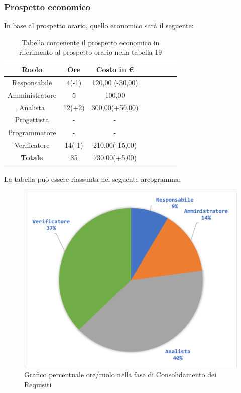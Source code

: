 		\subsubsection{Prospetto economico}
			In base al prospetto orario, quello economico sarà il seguente: 
			
			\begin{longtable}{|c|c|c|c|c|c|c|c}
				\hline
				\rowcolor{lighter-grayer}
				\textbf{Ruolo} & \textbf{Ore} & \textbf{Costo in €} \\
				\hline
				\endfirsthead
				
				\hline
				Responsabile & 4(-1) & 120,00 (-30,00)\\
				\hline
				\hline
				Amministratore & 5 & 100,00\\
				\hline
				\hline
				Analista & 12(+2) & 300,00(+50,00)\\
				\hline
				\hline
				Progettista & - & -\\
				\hline
				\hline
				Programmatore & -  & -\\
				\hline
				\hline
				Verificatore & 14(-1) & 210,00(-15,00)\\
				\hline
				\textbf{Totale} & 35 & 730,00(+5,00)\\
				\hline
				\caption{Tabella contenente il prospetto economico in riferimento al prospetto orario nella tabella 19}
			\end{longtable}
			\pagebreak
			
			La tabella può essere riassunta nel seguente areogramma:
			\begin{figure}[H]
				\centering
				\includegraphics[width=0.8\linewidth]{./images/ConsReqCons2.png}
				\caption{Grafico percentuale ore/ruolo nella fase di Consolidamento dei Requisiti}
				\label{fig:grafico costi ruolo fase di Consolidamento dei Requisiti}
			\end{figure}
		
